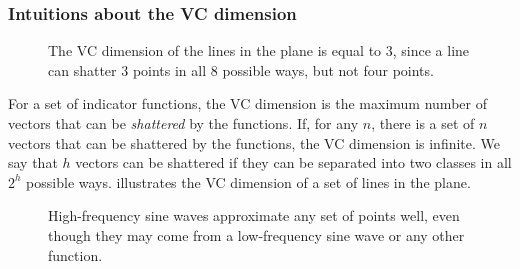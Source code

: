 \subsubsection{Intuitions about the VC dimension}
\label{sub:vc-dimension-intuition}

\begin{figure}
  \centering
  \caption{
  The VC dimension of the lines in the plane is equal to 3, since a line can shatter 3
  points in all 8 possible ways, but not four points.
  }
  \label{fig:vc-dimension}
\end{figure}

For a set of indicator functions, the VC dimension is the maximum number of vectors that
can be \emph{shattered} by the functions.  If, for any $n$, there is a set of $n$
vectors that can be shattered by the functions, the VC dimension is infinite.
We say that $h$ vectors can be shattered if they can be separated into two classes in all
$2^h$ possible ways.   illustrates the VC dimension of a set of
lines in the plane.

\begin{figure}
  \centering
  \caption{
  High-frequency sine waves approximate any set of points well, even though they may come
  from a low-frequency sine wave or any other function.
  }
  \label{fig:vc-sin}
\end{figure}

